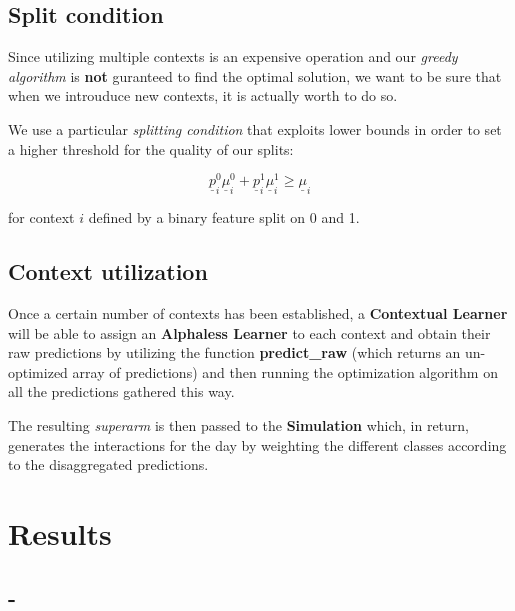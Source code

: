 \subsection{Split condition}

Since utilizing multiple contexts is an expensive operation and our \textit{greedy algorithm} is \textbf{not} guranteed to find the optimal solution, we want to be sure that when we introuduce new contexts, it is actually worth to do so.

We use a particular \textit{splitting condition} that exploits lower bounds in order to set a higher threshold for the quality of our splits:

\begin{Large}
    \begin{displaymath}
        \underline{p}_i^0 \underline{\mu}_i^0 + \underline{p}_i^1 \underline{\mu}_i^1 \geq \underline{\mu}_i
    \end{displaymath}
\end{Large}

for context $i$ defined by a binary feature split on 0 and 1.

\subsection{Context utilization}

Once a certain number of contexts has been established, a \textbf{Contextual Learner} will be able to assign an \textbf{Alphaless Learner} to each context and obtain their raw predictions by utilizing the function \textbf{predict\_raw} (which returns an un-optimized array of predictions) and then running the optimization algorithm on all the predictions gathered this way.

The resulting \textit{superarm} is then passed to the \textbf{Simulation} which, in return, generates the interactions for the day by weighting the different classes according to the disaggregated predictions.

\section{Results}

\subsection{-}

